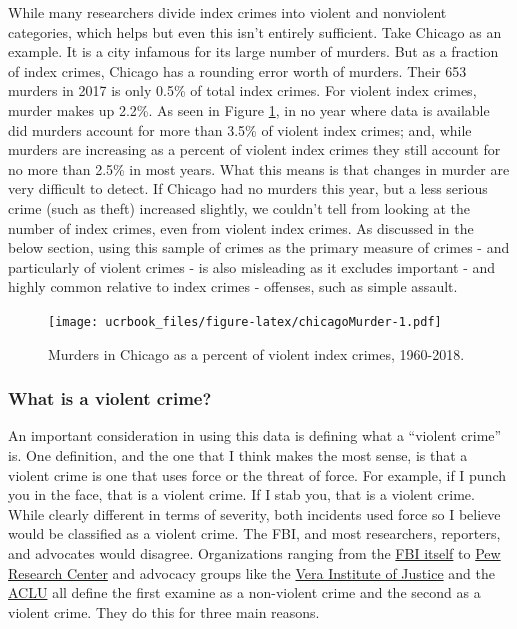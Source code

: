 \documentclass[
  12pt,
  openany]{book}
\begin{document}
While many researchers divide index crimes into violent and nonviolent categories, which helps but even this isn't entirely sufficient. Take Chicago as an example. It is a city infamous for its large number of murders. But as a fraction of index crimes, Chicago has a rounding error worth of murders. Their 653 murders in 2017 is only 0.5\% of total index crimes. For violent index crimes, murder makes up 2.2\%. As seen in Figure \ref{fig:chicagoMurder}, in no year where data is available did murders account for more than 3.5\% of violent index crimes; and, while murders are increasing as a percent of violent index crimes they still account for no more than 2.5\% in most years. What this means is that changes in murder are very difficult to detect. If Chicago had no murders this year, but a less serious crime (such as theft) increased slightly, we couldn't tell from looking at the number of index crimes, even from violent index crimes. As discussed in the below section, using this sample of crimes as the primary measure of crimes - and particularly of violent crimes - is also misleading as it excludes important - and highly common relative to index crimes - offenses, such as simple assault.

\begin{figure}
\centering
\texttt{[image: ucrbook\_files/figure-latex/chicagoMurder-1.pdf]}
\caption{\label{fig:chicagoMurder}Murders in Chicago as a percent of violent index crimes, 1960-2018.}
\end{figure}

\hypertarget{what-is-a-violent-crime}{%
\subsubsection{What is a violent crime?}\label{what-is-a-violent-crime}}

An important consideration in using this data is defining what a ``violent crime'' is. One definition, and the one that I think makes the most sense, is that a violent crime is one that uses force or the threat of force. For example, if I punch you in the face, that is a violent crime. If I stab you, that is a violent crime. While clearly different in terms of severity, both incidents used force so I believe would be classified as a violent crime. The FBI, and most researchers, reporters, and advocates would disagree. Organizations ranging from the \href{https://ucr.fbi.gov/crime-in-the-u.s/2019/crime-in-the-u.s.-2019/topic-pages/violent-crime}{FBI itself} to \href{https://www.pewresearch.org/fact-tank/2020/11/20/facts-about-crime-in-the-u-s/}{Pew Research Center} and advocacy groups like the \href{https://arresttrends.vera.org/data-sources-methodology}{Vera Institute of Justice} and the \href{https://www.aclu.org/report/tale-two-countries-racially-targeted-arrests-era-marijuana-reform}{ACLU} all define the first examine as a non-violent crime and the second as a violent crime. They do this for three main reasons.
\end{document}

